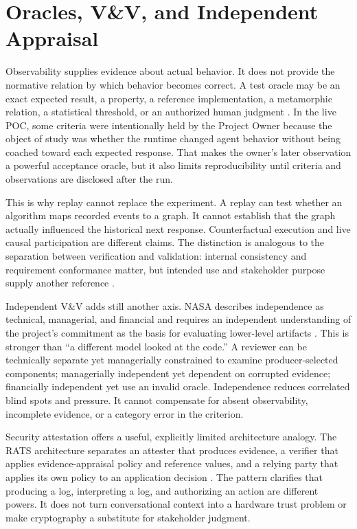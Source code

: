 \documentclass[10pt,a4paper]{article}
\begin{document}
\section{Oracles, V\&V, and Independent Appraisal}

Observability supplies evidence about actual behavior. It does not provide the normative relation by which behavior becomes correct. A test oracle may be an exact expected result, a property, a reference implementation, a metamorphic relation, a statistical threshold, or an authorized human judgment \cite{barr2015}. In the live POC, some criteria were intentionally held by the Project Owner because the object of study was whether the runtime changed agent behavior without being coached toward each expected response. That makes the owner's later observation a powerful acceptance oracle, but it also limits reproducibility until criteria and observations are disclosed after the run.

This is why replay cannot replace the experiment. A replay can test whether an algorithm maps recorded events to a graph. It cannot establish that the graph actually influenced the historical next response. Counterfactual execution and live causal participation are different claims. The distinction is analogous to the separation between verification and validation: internal consistency and requirement conformance matter, but intended use and stakeholder purpose supply another reference \cite{nasaivv,ieee1012}.

Independent V\&V adds still another axis. NASA describes independence as technical, managerial, and financial and requires an independent understanding of the project's commitment as the basis for evaluating lower-level artifacts \cite{nasa8739}. This is stronger than ``a different model looked at the code.'' A reviewer can be technically separate yet managerially constrained to examine producer-selected components; managerially independent yet dependent on corrupted evidence; financially independent yet use an invalid oracle. Independence reduces correlated blind spots and pressure. It cannot compensate for absent observability, incomplete evidence, or a category error in the criterion.

Security attestation offers a useful, explicitly limited architecture analogy. The RATS architecture separates an attester that produces evidence, a verifier that applies evidence-appraisal policy and reference values, and a relying party that applies its own policy to an application decision \cite{rfc9334}. The pattern clarifies that producing a log, interpreting a log, and authorizing an action are different powers. It does not turn conversational context into a hardware trust problem or make cryptography a substitute for stakeholder judgment.
\end{document}
